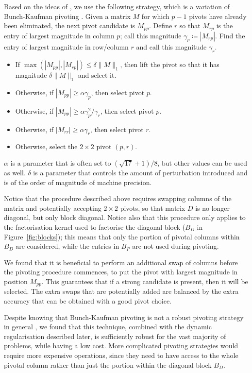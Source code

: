 \documentclass[a4paper]{article}
\newcommand{\0}{\mathbf 0}
\begin{document}
Based on the ideas of \cite{SchGar:pivoting}, we use the following strategy, which is a variation of Bunch-Kaufman pivoting \cite{BunKau:pivoting}. Given a matrix $M$ for which $p-1$ pivots have already been eliminated, the next pivot candidate is $M_{pp}$. Define $r$ so that $M_{rp}$ is the entry of largest magnitude in column $p$; call this magnitude $\gamma_p\coloneqq|M_{rp}|$. Find the entry of largest magnitude in row/column $r$ and call this magnitude $\gamma_r$.
\begin{itemize}
\item If $\max(|M_{pp}|,|M_{rp}|)\le \delta \|M\|_1$, then lift the pivot so that it has magnitude $\delta\|M\|_1$ and select it.
\item Otherwise, if $|M_{pp}|\ge\alpha\gamma_p$, then select pivot $p$.
\item Otherwise, if $|M_{pp}|\ge\alpha\gamma_p^2/\gamma_r$, then select pivot $p$.
\item Otherwise, if $|M_{rr}|\ge\alpha\gamma_r$, then select pivot $r$.
\item Otherwise, select the $2\times2$ pivot $(p,r)$.
\end{itemize}
$\alpha$ is a parameter that is often set to $(\sqrt{17}+1)/8$, but other values can be used as well. $\delta$ is a parameter that controls the amount of perturbation introduced and is of the order of magnitude of machine precision.

Notice that the procedure described above requires swapping columns of the matrix and potentially accepting $2\times2$ pivots, so that matrix $D$ is no longer diagonal, but only block diagonal. Notice also that this procedure only applies to the factorisation kernel used to factorise the diagonal block ($B_D$ in Figure~\ref{fig:blocks}); this means that only the portion of pivotal columns within $B_D$ are considered, while the entries in $B_P$ are not used during pivoting.

We found that it is beneficial to perform an additional swap of columns before the pivoting procedure commences, to put the pivot with largest magnitude in position $M_{pp}$. This guarantees that if a strong candidate is present, then it will be selected. The extra swaps that are potentially added are balanced by the extra accuracy that can be obtained with a good pivot choice. 

Despite knowing that Bunch-Kaufman pivoting is not a robust pivoting strategy in general \cite{AshGriLew:pivoting}, we found that this technique, combined with the dynamic regularisation described later, is sufficiently robust for the vast majority of problems, while having a low cost. More complicated pivoting strategies would require more expensive operations, since they need to have access to the whole pivotal column rather than just the portion within the diagonal block $B_D$.
\end{document}
